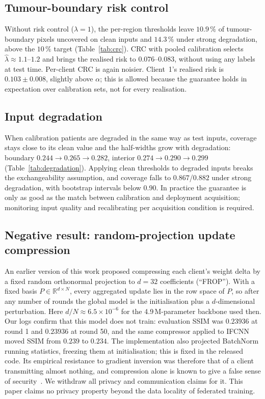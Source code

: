 \documentclass[conference]{IEEEtran}
\begin{document}
\subsection{Tumour-boundary risk control}
Without risk control ($\lambda{=}1$), the per-region thresholds leave $10.9\,\%$ of tumour-boundary pixels uncovered on clean inputs and $14.3\,\%$ under strong degradation, above the $10\,\%$ target (Table~\ref{tab:crc}). CRC with pooled calibration selects $\hat\lambda\approx1.1$--$1.2$ and brings the realised risk to $0.076$--$0.083$, without using any labels at test time. Per-client CRC is again noisier. Client~1's realised risk is $0.103{\pm}0.008$, slightly above $\alpha$; this is allowed because the guarantee holds in expectation over calibration sets, not for every realisation.



\subsection{Input degradation}
When calibration patients are degraded in the same way as test inputs, coverage stays close to its clean value and the half-widths grow with degradation: boundary $0.244\to0.265\to0.282$, interior $0.274\to0.290\to0.299$ (Table~\ref{tab:degradation}). Applying clean thresholds to degraded inputs breaks the exchangeability assumption, and coverage falls to $0.867$/$0.882$ under strong degradation, with bootstrap intervals below $0.90$. In practice the guarantee is only as good as the match between calibration and deployment acquisition; monitoring input quality and recalibrating per acquisition condition is required.



\subsection{Negative result: random-projection update compression}
\label{ssec:frop}
An earlier version of this work proposed compressing each client's weight delta by a fixed random orthonormal projection to $d{=}32$ coefficients (``FROP''). With a fixed basis $P\in\mathbb{R}^{d\times N}$, every aggregated update lies in the row space of $P$, so after any number of rounds the global model is the initialisation plus a $d$-dimensional perturbation. Here $d/N\approx 6.5\times10^{-6}$ for the 4.9\,M-parameter backbone used then. Our logs confirm that this model does not train: evaluation SSIM was $0.23936$ at round 1 and $0.23936$ at round 50, and the same compressor applied to IFCNN moved SSIM from $0.239$ to $0.234$. The implementation also projected BatchNorm running statistics, freezing them at initialisation; this is fixed in the released code. Its empirical resistance to gradient inversion was therefore that of a client transmitting almost nothing, and compression alone is known to give a false sense of security~\cite{yue2023obfuscation}. We withdraw all privacy and communication claims for it. This paper claims no privacy property beyond the data locality of federated training.
\end{document}
